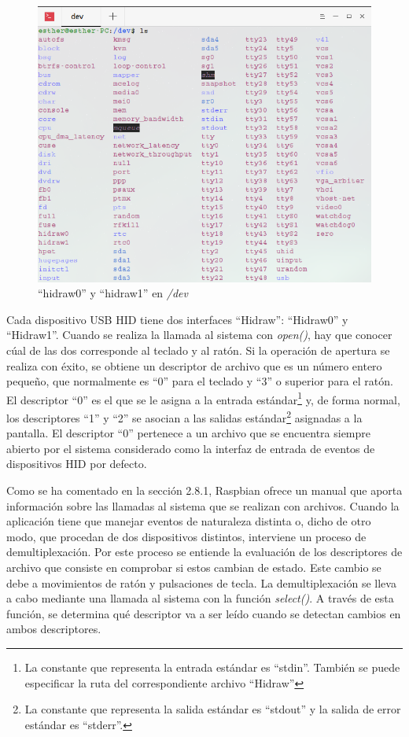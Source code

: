 \begin{figure}
\centering
\includegraphics[scale = 0.4]{capitulo_03/figuras_dir/dev.jpg}
\caption{``hidraw0'' y ``hidraw1'' en {\itshape /dev}}
\end{figure}

Cada dispositivo USB HID tiene dos interfaces ``Hidraw'': ``Hidraw0'' y ``Hidraw1''. Cuando se realiza la llamada al sistema con {\itshape open()}, hay que conocer cúal de las dos corresponde al teclado y al ratón. Si la operación de apertura se realiza con éxito, se obtiene un descriptor de archivo que es un número entero pequeño, que normalmente es ``0'' para el teclado y ``3'' o superior para el ratón. El descriptor ``0'' es el que se le asigna a la  entrada estándar\footnote{La constante que representa la entrada estándar es ``stdin''. También se puede especificar la ruta del correspondiente archivo ``Hidraw''} y, de forma normal, los descriptores ``1'' y ``2'' se asocian a las salidas estándar\footnote{La constante que representa la salida estándar es ``stdout'' y la salida de error estándar es ``stderr''.} asignadas a la pantalla. El descriptor ``0'' pertenece a un archivo que se encuentra siempre abierto por el sistema considerado como la interfaz de entrada de eventos de dispositivos HID por defecto.

Como se ha comentado en la sección 2.8.1, Raspbian ofrece un manual que aporta información sobre las llamadas al sistema que se realizan con archivos. Cuando la aplicación tiene que manejar eventos de naturaleza distinta o, dicho de otro modo, que procedan de dos dispositivos distintos, interviene un proceso de demultiplexación. Por este proceso se entiende la evaluación de los descriptores de archivo que consiste en comprobar si estos cambian de estado. Este cambio se debe a movimientos de ratón y pulsaciones de tecla. La demultiplexación se lleva a cabo mediante una llamada al sistema con la función {\itshape select()}. A través de esta función, se determina qué descriptor va a ser leído cuando se detectan cambios en ambos descriptores.

